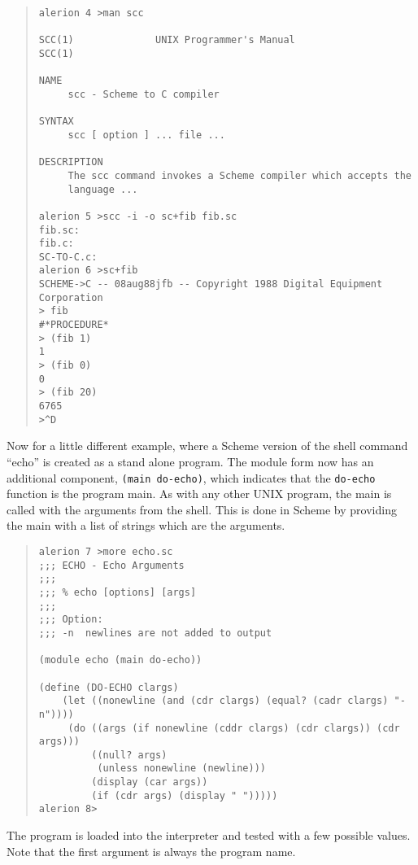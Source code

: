 \documentclass[11pt]{article}
\begin{document}
\begin{small}
\begin{quote}
\begin{verbatim}
alerion 4 >man scc

SCC(1)              UNIX Programmer's Manual               SCC(1)

NAME
     scc - Scheme to C compiler

SYNTAX
     scc [ option ] ... file ...

DESCRIPTION
     The scc command invokes a Scheme compiler which accepts the
     language ...

alerion 5 >scc -i -o sc+fib fib.sc
fib.sc:
fib.c:
SC-TO-C.c:
alerion 6 >sc+fib
SCHEME->C -- 08aug88jfb -- Copyright 1988 Digital Equipment Corporation
> fib
#*PROCEDURE*
> (fib 1)
1
> (fib 0)
0
> (fib 20)
6765
>^D
\end{verbatim}
\end{quote}
\end{small}

Now for a little different example, where a Scheme version of the
shell command ``echo'' is created as a stand alone program. The module
form now has an additional component, \texttt{(main do-echo)}, which
indicates that the \texttt{do-echo} function is the program main. As with
any other UNIX program, the main is called with the arguments from
the shell.  This is done in Scheme by providing the main with a list
of strings which are the arguments.

\begin{small}
\begin{quote}
\begin{verbatim}
alerion 7 >more echo.sc
;;; ECHO - Echo Arguments
;;;
;;; % echo [options] [args]
;;;
;;; Option:
;;;	-n	newlines are not added to output

(module echo (main do-echo))

(define (DO-ECHO clargs)
    (let ((nonewline (and (cdr clargs) (equal? (cadr clargs) "-n"))))
	 (do ((args (if nonewline (cddr clargs) (cdr clargs)) (cdr args)))
	     ((null? args)
	      (unless nonewline (newline)))
	     (display (car args))
	     (if (cdr args) (display " ")))))
alerion 8>
\end{verbatim}
\end{quote}
\end{small}

The program is loaded into the interpreter and tested with a few
possible values.  Note that the first argument is always the program
name.
\end{document}

